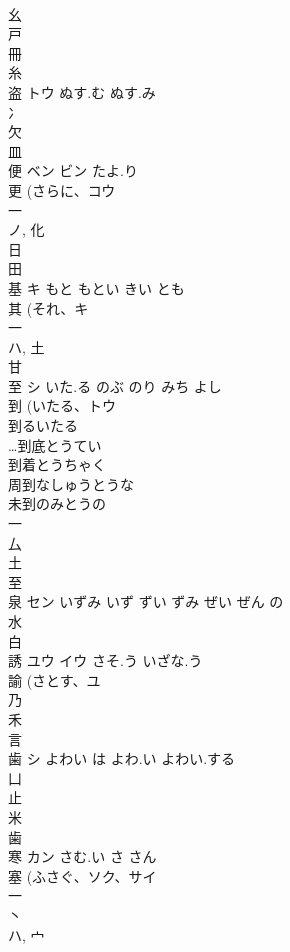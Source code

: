 \documentclass[8pt]{extreport}
\begin{document}
\begin{CJK}{UTF8}{min}
\\	幺 
\\	戸 
\\	冊 
\\	糸 
\\	盗	トウ	ぬす.む ぬす.み	
\\	冫 
\\	欠 
\\	皿 
\\	便	ベン ビン	たよ.り	
\\	更 (さらに、コウ 
\\	一 
\\	ノ, 化 
\\	日 
\\	田 
\\	基	キ	もと もとい きい とも	
\\	其 (それ、キ 
\\	一 
\\	ハ, 土 
\\	甘 
\\	至	シ	いた.る のぶ のり みち よし	
\\	到 (いたる、トウ 
\\	到るいたる
\\	…到底とうてい
\\	到着とうちゃく
\\	周到なしゅうとうな
\\	未到のみとうの
\\	一 
\\	厶 
\\	土 
\\	至 
\\	泉	セン	いずみ いず ずい ずみ ぜい ぜん の	
\\	水 
\\	白 
\\	誘	ユウ イウ	さそ.う いざな.う	
\\	諭 (さとす、ユ 
\\	乃 
\\	禾 
\\	言 
\\	歯	シ	よわい は よわ.い よわい.する	
\\	凵 
\\	止 
\\	米 
\\	歯 
\\	寒	カン	さむ.い さ さん	
\\	塞 (ふさぐ、ソク、サイ 
\\	一 
\\	丶 
\\	ハ, 宀 

\end{CJK}
\end{document}
